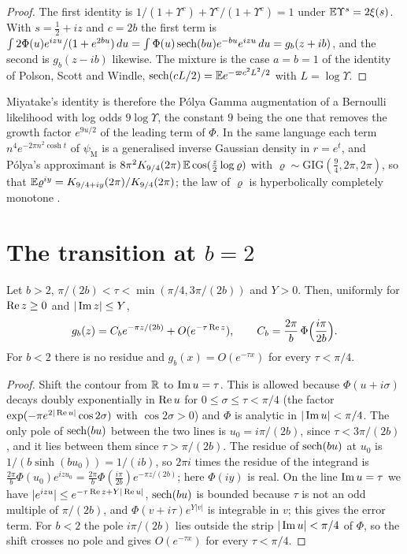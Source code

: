 \begin{proof}
The first identity is $1/(1+\Upsilon^c)+\Upsilon^c/(1+\Upsilon^c)=1$ under $\mathbb{E}\Upsilon^s=2\xi(s)$. With $s=\frac12+iz$ and $c=2b$ the first term is $\int2\Phi(u)e^{izu}/(1+e^{2bu})\,du=\int\Phi(u)\operatorname{sech}(bu)e^{-bu}e^{izu}\,du=g_b(z+ib)$, and the second is $g_b(z-ib)$ likewise. The mixture is the case $a=b=1$ of the identity of Polson, Scott and Windle, $\operatorname{sech}(cL/2)=\mathbb{E} e^{-\varpi c^2L^2/2}$ with $L=\log\Upsilon$.
\end{proof}

Miyatake's identity is therefore the P\'olya Gamma augmentation of a Bernoulli likelihood with log odds $9\log\Upsilon$, the constant $9$ being the one that removes the growth factor $e^{9u/2}$ of the leading term of $\Phi$. In the same language each term $n^4e^{-2\pi n^2\cosh t}$ of $\psi_{\mathrm M}$ is a generalised inverse Gaussian density in $r=e^t$, and P\'olya's approximant is $8\pi^2K_{9/4}(2\pi)\,\mathbb{E}\cos(\frac z2\log\varrho)$ with $\varrho\sim\mathrm{GIG}(\frac94,2\pi,2\pi)$, so that $\mathbb{E}\varrho^{iy}=K_{9/4+iy}(2\pi)/K_{9/4}(2\pi)$; the law of $\varrho$ is hyperbolically completely monotone \cite{Bondesson}.

\section{The transition at \texorpdfstring{$b=2$}{b = 2}}\label{mi:sec:btwo}

\begin{theorem}\label{mi:thm:tail}
Let $b>2$, $\pi/(2b)<\tau<\min(\pi/4,3\pi/(2b))$ and $Y>0$. Then, uniformly for $\operatorname{Re} z\ge0$ and $|\operatorname{Im} z|\le Y$,
\[
g_b(z)=C_be^{-\pi z/(2b)}+O(e^{-\tau\operatorname{Re} z}),\qquad C_b=\frac{2\pi}b\,\Phi\Big(\frac{i\pi}{2b}\Big).
\]
For $b<2$ there is no residue and $g_b(x)=O(e^{-\tau x})$ for every $\tau<\pi/4$.
\end{theorem}

\begin{proof}
Shift the contour from $\mathbb{R}$ to $\operatorname{Im} u=\tau$. This is allowed because $\Phi(u+i\sigma)$ decays doubly exponentially in $\operatorname{Re} u$ for $0\le\sigma\le\tau<\pi/4$ (the factor $\exp(-\pi e^{2|\operatorname{Re} u|}\cos2\sigma)$ with $\cos2\sigma>0$) and $\Phi$ is analytic in $|\operatorname{Im} u|<\pi/4$. The only pole of $\operatorname{sech}(bu)$ between the two lines is $u_0=i\pi/(2b)$, since $\tau<3\pi/(2b)$, and it lies between them since $\tau>\pi/(2b)$. The residue of $\operatorname{sech}(bu)$ at $u_0$ is $1/(b\sinh(bu_0))=1/(ib)$, so $2\pi i$ times the residue of the integrand is $\frac{2\pi}b\Phi(u_0)e^{izu_0}=\frac{2\pi}b\Phi(\frac{i\pi}{2b})e^{-\pi z/(2b)}$; here $\Phi(iy)$ is real. On the line $\operatorname{Im} u=\tau$ we have $|e^{izu}|\le e^{-\tau\operatorname{Re} z+Y|\operatorname{Re} u|}$, $\operatorname{sech}(bu)$ is bounded because $\tau$ is not an odd multiple of $\pi/(2b)$, and $\Phi(v+i\tau)e^{Y|v|}$ is integrable in $v$; this gives the error term. For $b<2$ the pole $i\pi/(2b)$ lies outside the strip $|\operatorname{Im} u|<\pi/4$ of $\Phi$, so the shift crosses no pole and gives $O(e^{-\tau x})$ for every $\tau<\pi/4$.
\end{proof}

